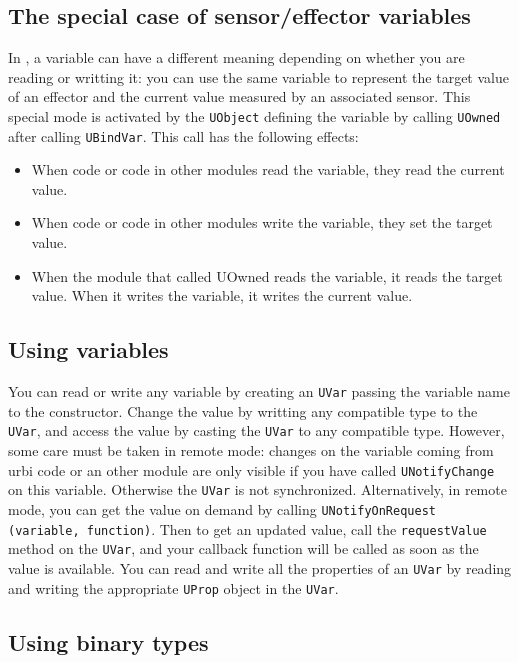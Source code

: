 \subsection{The special case of sensor/effector variables}

In \urbi, a variable can have a different meaning depending on whether
you are reading or writting it: you can use the same variable to
represent the target value of an effector and the current value
measured by an associated sensor. This special mode is activated by
the \lstinline{UObject} defining the variable by calling
\lstinline{UOwned} after calling \lstinline{UBindVar}. This call has
the following effects:

\begin{itemize}
\item{When \urbi code or code in other modules read the variable, they
  read the current value.}
\item{When \urbi code or code in other modules write the variable, they
  set the target value.}
\item{When the module that called UOwned reads the variable, it reads
  the target value. When it writes the variable, it writes the current
  value.}
\end{itemize}

\subsection{Using \urbi variables}

You can read or write any \urbi variable by creating an
\lstinline{UVar} passing the variable name to the constructor. Change
the value by writting any compatible type to the \lstinline{UVar}, and
access the value by casting the \lstinline{UVar} to any compatible
type. However, some care must be taken in remote mode: changes on the
variable coming from urbi code or an other module are only visible if
you have called \lstinline{UNotifyChange} on this variable. Otherwise
the \lstinline{UVar} is not synchronized. Alternatively, in remote
mode, you can get the value on demand by calling
\lstinline{UNotifyOnRequest (variable, function)}. Then to get an
updated value, call the \lstinline{requestValue} method on the
\lstinline{UVar}, and your callback function will be called as soon as
the value is available. You can read and write all the \urbi
properties of an \lstinline{UVar} by reading and writing the
appropriate \lstinline{UProp} object in the \lstinline{UVar}.

\subsection{Using binary types}

